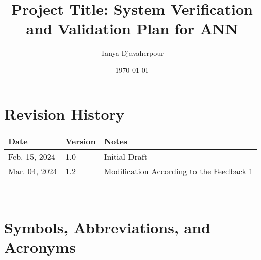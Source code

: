 \documentclass[12pt, titlepage]{article}
\begin{document}
\title{Project Title: System Verification and Validation Plan for ANN} 
\author{Tanya Djavaherpour}
\date{\today}
	
\maketitle


\section*{Revision History}

\begin{tabularx}{\textwidth}{p{3cm}p{2cm}X}
\toprule {\bf Date} & {\bf Version} & {\bf Notes}\\
\midrule
Feb. 15, 2024 & 1.0 & Initial Draft\\
Mar. 04, 2024 & 1.2 & Modification According to the Feedback 1\\
\bottomrule
\end{tabularx}

~\\


\newpage

\tableofcontents

\listoftables
{}


\newpage

\section{Symbols, Abbreviations, and Acronyms}
\end{document}
